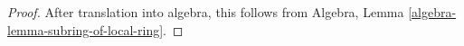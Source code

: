 \begin{proof}
After translation into algebra, this follows from
Algebra, Lemma \ref{algebra-lemma-subring-of-local-ring}.
\end{proof}













